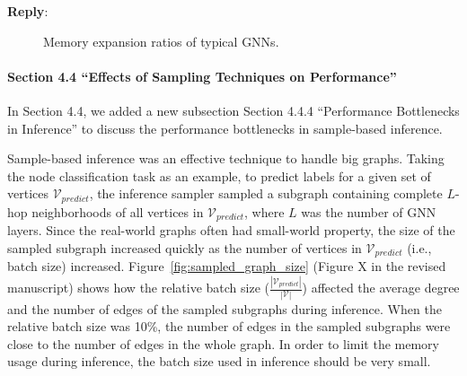 \documentclass[12pt]{article}
\newenvironment{reply}
   {\medskip \noindent \textbf{Reply}:\  }
   {\medskip}
\begin{document}
\begin{reply}
     \begin{figure}[H]
        \caption{Memory expansion ratios of typical GNNs.}
        \label{fig:compare_memory_expasion_ratio}
     \end{figure}
     
     \paragraph{Section 4.4 ``Effects of Sampling Techniques on Performance''}
     In Section 4.4, we added a new subsection  Section 4.4.4 ``Performance Bottlenecks in Inference'' to discuss the performance bottlenecks in sample-based inference.
     
     Sample-based inference was an effective technique to handle big graphs.
     Taking the node classification task as an example, to predict labels for a given set of vertices $\mathcal{V}_{predict}$, the inference sampler sampled a subgraph containing complete $L$-hop neighborhoods of all vertices in $\mathcal{V}_{predict}$, where $L$ was the number of GNN layers.
     Since the real-world graphs often had small-world property, the size of the sampled subgraph increased quickly as the number of vertices in $\mathcal{V}_{predict}$ (i.e., batch size) increased.
     Figure~\ref{fig:sampled_graph_size} (Figure X in the revised manuscript) shows how the relative batch size ($\frac{|\mathcal{V}_{predict}|}{|\mathcal{V}|}$) affected the average degree and the number of edges of the sampled subgraphs during inference.
     When the relative batch size was 10\%, the number of edges in the sampled subgraphs were close to the number of edges in the whole graph.
     In order to limit the memory usage during inference, the batch size used in inference should be very small.
     

\end{reply}
\end{document}
